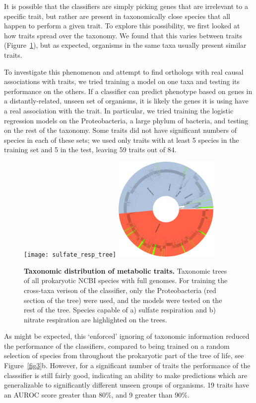 \documentclass[10pt,letterpaper]{article}
\begin{document}
It is possible that the classifiers are simply picking genes that are irrelevant to a specific trait, but rather are present in taxonomically close species that all happen to perform a given trait. To explore this possibility, we first looked at how traits spread over the taxonomy. We found that this varies between traits (Figure~\ref{fig4}), but as expected, organisms in the same taxa usually present similar traits. 

To investigate this phenomenon and attempt to find orthologs with real causal associations with traits, we tried training a model on one taxa and testing its performance on the others. If a classifier can predict phenotype based on genes in a distantly-related, unseen set of organisms, it is likely the genes it is using have a real association with the trait. In particular, we tried training the logistic regression models on the Proteobacteria, a large phylum of bacteria, and testing on the rest of the taxonomy. Some traits did not have significant numbers of species in each of these sets; we used only traits with at least 5 species in the training set and 5 in the test, leaving 59 traits out of 84. 

\begin{figure}
\texttt{[image: sulfate\_resp\_tree]}
\includegraphics[width=0.45\textwidth]{nitrate_resp_tree}
\caption{{\bf Taxonomic distribution of metabolic traits.}
Taxonomic trees of all prokaryotic NCBI species with full genomes. For training the cross-taxa verison of the classifier, only the Proteobacteria (red section of the tree) were used, and the models were tested on the rest of the tree. Species capable of a) sulfate respiration and b) nitrate respiration are highlighted on the trees.}
\label{fig4}
\end{figure}

As might be expected, this `enforced' ignoring of taxonomic information reduced the performance of the classifiers, compared to being trained on a random selection of species from throughout the prokaryotic part of the tree of life, see Figure~\ref{fig3}b. However, for a significant number of traits the performance of the classsifier is still fairly good, indicating an ability to make predictions which are generalizable to significantly different unseen groups of organisms. 19 traits have an AUROC score greater than 80\%, and 9 greater than 90\%. 
\end{document}
